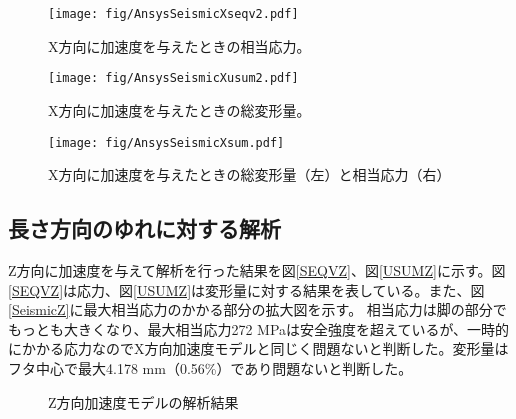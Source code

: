 \documentclass[11pt]{ltjsreport}
\newcommand{\figref}[1]{図\ref{#1}}
\begin{document}
\begin{figure}[htbp]
\begin{minipage}{0.47\textwidth}
\centering
\texttt{[image: fig/AnsysSeismicXseqv2.pdf]}
\caption[X方向に加速度を与えたときの相当応力]{X方向に加速度を与えたときの相当応力。}
\label{SEQVX}
\end{minipage}
\hfill
\begin{minipage}{0.47\textwidth}
\centering
\texttt{[image: fig/AnsysSeismicXusum2.pdf]}
\caption[X方向に加速度を与えたときの総変形量]{X方向に加速度を与えたときの総変形量。}
\label{USUMX}
\end{minipage}
\end{figure}
\fi%

\begin{figure}[htbp]
\centering
\texttt{[image: fig/AnsysSeismicXsum.pdf]}
\caption[X方向に加速度を与えたときの総変形量と相当応力]{X方向に加速度を与えたときの総変形量（左）と相当応力（右）}
\label{SeismicX}
\end{figure}


\subsection{長さ方向のゆれに対する解析}

Z方向に加速度を与えて解析を行った結果を\figref{SEQVZ}、\figref{USUMZ}に示す。\figref{SEQVZ}は応力、\figref{USUMZ}は変形量に対する結果を表している。また、\figref{SeismicZ}に最大相当応力のかかる部分の拡大図を示す。
相当応力は脚の部分でもっとも大きくなり、最大相当応力272 MPaは安全強度を超えているが、一時的にかかる応力なのでX方向加速度モデルと同じく問題ないと判断した。変形量はフタ中心で最大4.178 mm（0.56\%）であり問題ないと判断した。

\begin{figure}[htbp]
  \begin{minipage}{0.47\textwidth}
  \end{minipage}
  \hfill
  \begin{minipage}{0.47\textwidth}
  \end{minipage}
    \caption{Z方向加速度モデルの解析結果}
  \label{Zmatome}
\end{figure}
\end{document}

